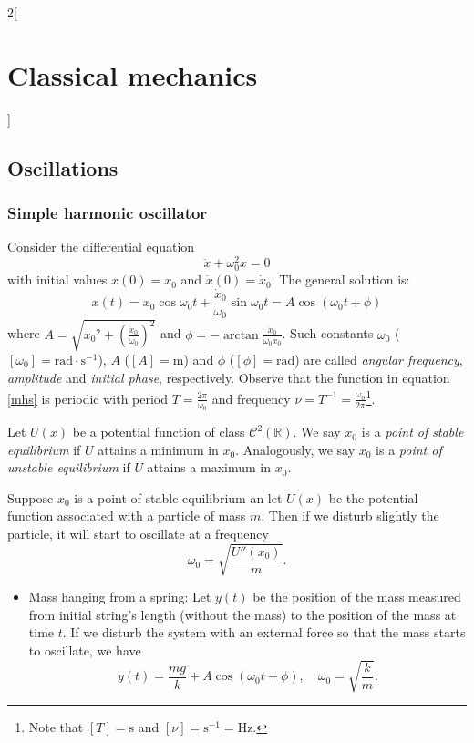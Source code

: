 \documentclass[../../../main.tex]{subfiles}
\begin{document}
\begin{multicols}{2}[\section{Classical mechanics}]
    \subsection{Oscillations}
    \subsubsection*{Simple harmonic oscillator}
    \begin{prop}
        Consider the differential equation $$\ddot{x}+\omega_0^2 x=0$$ with initial values $x(0)=x_0$ and $\dot{x}(0)=\dot{x}_0$. The general solution is:
        \begin{equation}
            x(t)=x_0\cos\omega_0t+\frac{\dot{x}_0}{\omega_0}\sin\omega_0t=A\cos(\omega_0t+\phi)
            \label{mhs}
        \end{equation} where $\displaystyle A=\sqrt{{x_0}^2+{\left(\frac{\dot{x}_0}{\omega_0}\right)}^2}$ and $\displaystyle \phi=-\arctan\frac{\dot{x}_0}{\omega_0x_0}$. Such constants $\omega_0$ ($[\omega_0]=\text{rad}\cdot \text{s}^{-1}$), $A$ ($[A]=\text{m}$) and $\phi$ ($[\phi]=\text{rad}$) are called \textit{angular frequency}, \textit{amplitude} and \textit{initial phase}, respectively. Observe that the function in equation \eqref{mhs} is periodic with period $T=\frac{2\pi}{\omega_0}$ and frequency $\nu=T^{-1}=\frac{\omega_0}{2\pi}$\footnote{Note that $[T]=\text{s}$ and $[\nu]=\text{s}^{-1}=\text{Hz}$.}.
    \end{prop}
    \begin{definition}
        Let $U(x)$ be a potential function of class $\mathcal{C}^2(\mathbb{R})$. We say $x_0$ is a \textit{point of stable equilibrium} if $U$ attains a minimum in $x_0$. Analogously, we say $x_0$ is a \textit{point of unstable equilibrium} if $U$ attains a maximum in $x_0$.
    \end{definition}
    \begin{prop}
        Suppose $x_0$ is a point of stable equilibrium an let $U(x)$ be the potential function associated with a particle of mass $m$. Then if we disturb slightly the particle, it will start to oscillate at a frequency $$\omega_0=\sqrt{\frac{U''(x_0)}{m}}.$$
    \end{prop}
    \begin{prop}[Examples]
        \hfill
        \begin{itemize}
            \item Mass hanging from a spring: Let $y(t)$ be the position of the mass measured from initial string's length (without the mass) to the position of the mass at time $t$. If we disturb the system with an external force so that the mass starts to oscillate, we have $$y(t)=\frac{mg}{k}+A\cos(\omega_0t+\phi),\quad\omega_0=\sqrt{\frac{k}{m}}.$$

\end{itemize}
\end{prop}
\end{multicols}
\end{document}
